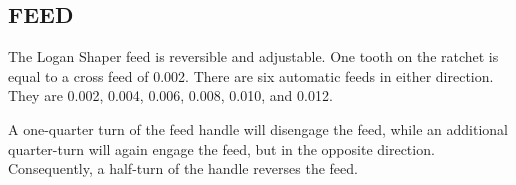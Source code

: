\documentclass{article}
\begin{document}
\subsection{FEED}

The Logan Shaper feed is reversible and adjustable.  One tooth on the
ratchet is equal to a cross feed of 0.002\inch.  There are six
automatic feeds in either direction.  They are 0.002\inch, 0.004\inch,
0.006\inch, 0.008\inch, 0.010\inch, and 0.012\inch.

A one-quarter turn of the feed handle will disengage the feed, while
an additional quarter-turn will again engage the feed, but in the
opposite direction.  Consequently, a half-turn of the handle reverses
the feed.
\end{document}
